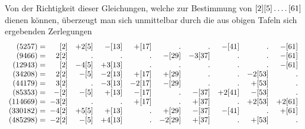 \par Von der Richtigkeit dieser Gleichungen, welche zur Bestimmung von $[2][5]\mathinner{.\,.\,.\,.}[61]$ dienen können, überzeugt man sich unmittelbar durch die aus obigen Tafeln sich ergebenden Zerlegungen
\begingroup\fontsize{10}{13}\selectfont\setlength{\arraycolsep}{1.3pt}
\[
\begin{array}{r@{\;}rrrrrrrrr}
(5257)={} & [2] & +2[5] & -[13] & +[17] & \pdot & \pdot & -[41] & \pdot & -[61] \\
(9466)={} & 2[2] & \pdot & \pdot & \pdot & -[29] & -3[37] & \pdot & \pdot & -[61] \\
(12943)={} & [2] & -4[5] & +3[13] & \pdot & \pdot & \pdot & \pdot & \pdot & -[61] \\
(34208)={} & 2[2] & -[5] & -2[13] & +[17] & +[29] & \pdot & \pdot & -2[53] & \pdot \\
(44179)={} & 3[2] & \pdot & -3[13] & -2[17] & -[29] & \pdot & \pdot & +[53] & \pdot \\
(85353)={} & -[2] & -[5] & +[13] & -[17] & \pdot & -[37] & +2[41] & -[53] & \pdot \\
(114669)={} & -3[2] & \pdot & \pdot & +[17] & \pdot & +[37] & \pdot & +2[53] & +2[61] \\
(330182)={} & -4[2] & +5[5] & +[13] & \pdot & +[29] & -[37] & -[41] & \pdot & +[61] \\
(485298)={} & -2[2] & -[5] & +4[13] & \pdot & -2[29] & +[37] & \pdot & +[53] & \pdot \\
\end{array}
\]
\endgroup

